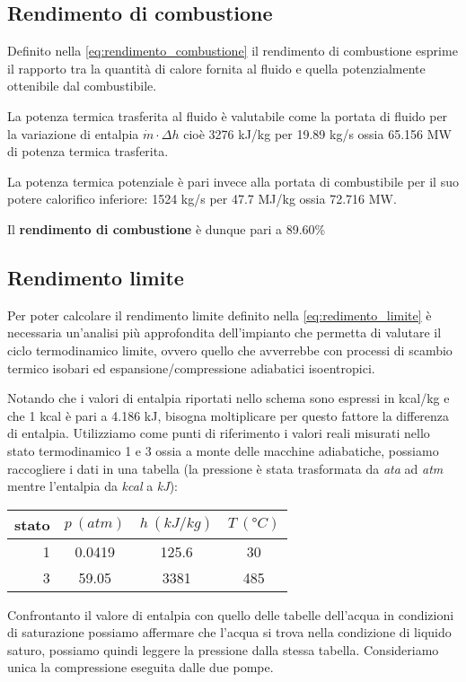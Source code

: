 \documentclass[a4paper,12pt]{article}
\begin{document}
\subsection{Rendimento di combustione}
\label{subsec:rendimento_combustione}
Definito nella \eqref{eq:rendimento_combustione} il rendimento di combustione esprime il rapporto tra la quantità di calore
fornita al fluido e quella potenzialmente ottenibile dal combustibile.

La potenza termica trasferita al fluido è valutabile come la portata di fluido per la variazione di entalpia $\dot m\cdot \Delta h$
cioè 3276 kJ/kg per 19.89 kg/s ossia 65.156 MW di potenza termica trasferita.

La potenza termica potenziale è pari invece alla portata di combustibile per il suo potere calorifico inferiore:
1524 kg/s per 47.7 MJ/kg ossia 72.716 MW.

Il \textbf{rendimento di combustione} è dunque pari a 89.60\%

\subsection{Rendimento limite}
\label{subsec:rendimento_limite}
Per poter calcolare il rendimento limite definito nella \eqref{eq:redimento_limite} è necessaria un'analisi
più approfondita dell'impianto che permetta di valutare il ciclo termodinamico limite, ovvero quello che avverrebbe
con processi di scambio termico isobari ed espansione/compressione adiabatici isoentropici. 

Notando che i valori di entalpia riportati nello schema sono espressi in kcal/kg e che 1 kcal è pari a 4.186 kJ,
bisogna moltiplicare per questo fattore la differenza di entalpia.
Utilizziamo come punti di riferimento i valori reali misurati nello stato termodinamico 1 e 3 ossia a monte delle macchine
adiabatiche, possiamo raccogliere i dati in una tabella
(la pressione è stata trasformata da \textit{ata} ad \textit{atm} mentre l'entalpia da \textit{kcal} a \textit{kJ}):
\begin{center}
    \begin{tabular}{r|c|c|c}
        stato    & $p\ (atm)$ & $h\ (kJ/kg)$ & $T\ (\text{°}C) $\\ \hline
        1   &        0.0419 &          125.6   &           30     \\ \hline
        3   &        59.05  &           3381   &           485
    \end{tabular}
\end{center}
Confrontanto il valore di entalpia con quello delle tabelle dell'acqua in condizioni di saturazione possiamo affermare
che l'acqua si trova nella condizione di liquido saturo, possiamo quindi leggere la pressione dalla stessa tabella.
Consideriamo unica la compressione eseguita dalle due pompe.
\end{document}
